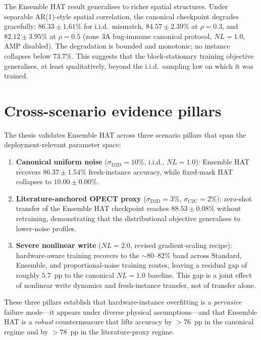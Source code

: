 The Ensemble HAT result generalises to richer spatial structures.  Under separable AR(1)-style spatial correlation, the canonical checkpoint degrades gracefully: $86.33\pm1.61\%$ for i.i.d.~mismatch, $84.57\pm2.39\%$ at $\rho=0.3$, and $82.12\pm3.95\%$ at $\rho=0.5$ (zone 3A bug-immune canonical protocol, $NL=1.0$, AMP disabled).  The degradation is bounded and monotonic; no instance collapses below $73.7\%$.  This suggests that the block-stationary training objective generalises, at least qualitatively, beyond the i.i.d.~sampling law on which it was trained.


\section{Cross-scenario evidence pillars}
\label{sec:ch1-three-pillars}

The thesis validates Ensemble HAT across three scenario pillars that span the deployment-relevant parameter space:

\begin{enumerate}
    \item \textbf{Canonical uniform noise} ($\sigma_{\mathrm{D2D}}=10\%$, i.i.d., $NL=1.0$): Ensemble HAT recovers $86.37\pm1.54\%$ fresh-instance accuracy, while fixed-mask HAT collapses to $10.00\pm0.00\%$.
    
    \item \textbf{Literature-anchored OPECT proxy} ($\sigma_{\mathrm{D2D}}=3\%$, $\sigma_{\mathrm{C2C}}=2\%$): zero-shot transfer of the Ensemble HAT checkpoint reaches $88.53\pm0.08\%$ without retraining, demonstrating that the distributional objective generalises to lower-noise profiles.
    
    \item \textbf{Severe nonlinear write} ($NL=2.0$, revised gradient-scaling recipe): hardware-aware training recovers to the $\sim$80--82\% band across Standard, Ensemble, and proportional-noise training routes, leaving a residual gap of roughly $5.7$~pp to the canonical $NL=1.0$ baseline.  This gap is a joint effect of nonlinear write dynamics and fresh-instance transfer, not of transfer alone.
\end{enumerate}

These three pillars establish that hardware-instance overfitting is a \emph{pervasive} failure mode---it appears under diverse physical assumptions---and that Ensemble HAT is a \emph{robust} countermeasure that lifts accuracy by $>76$~pp in the canonical regime and by $>78$~pp in the literature-proxy regime.


